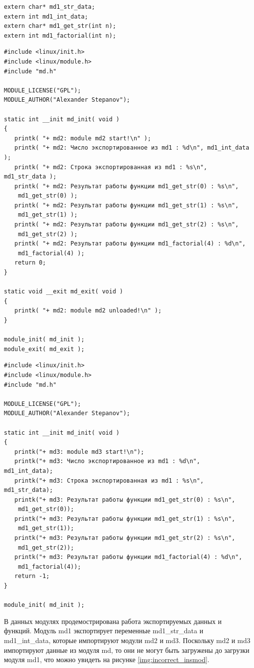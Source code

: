\begin{lstlisting}[caption=md.h]
extern char* md1_str_data;
extern int md1_int_data;
extern char* md1_get_str(int n);
extern int md1_factorial(int n);
\end{lstlisting}

\begin{lstlisting}[caption=md2.c]
#include <linux/init.h> 
#include <linux/module.h> 
#include "md.h" 

MODULE_LICENSE("GPL"); 
MODULE_AUTHOR("Alexander Stepanov"); 

static int __init md_init( void ) 
{ 
   printk( "+ md2: module md2 start!\n" ); 
   printk( "+ md2: Число экспортированное из md1 : %d\n", md1_int_data ); 
   printk( "+ md2: Строка экспортированная из md1 : %s\n", md1_str_data ); 
   printk( "+ md2: Результат работы функции md1_get_str(0) : %s\n",
    md1_get_str(0) );
   printk( "+ md2: Результат работы функции md1_get_str(1) : %s\n",
    md1_get_str(1) );
   printk( "+ md2: Результат работы функции md1_get_str(2) : %s\n",
    md1_get_str(2) );
   printk( "+ md2: Результат работы функции md1_factorial(4) : %d\n",
    md1_factorial(4) );  
   return 0; 
} 

static void __exit md_exit( void ) 
{ 
   printk( "+ md2: module md2 unloaded!\n" ); 
} 

module_init( md_init ); 
module_exit( md_exit );
\end{lstlisting}

\begin{lstlisting}[caption=md3.c]
#include <linux/init.h> 
#include <linux/module.h> 
#include "md.h" 

MODULE_LICENSE("GPL"); 
MODULE_AUTHOR("Alexander Stepanov"); 

static int __init md_init( void ) 
{ 
   printk("+ md3: module md3 start!\n"); 
   printk("+ md3: Число экспортированное из md1 : %d\n", md1_int_data); 
   printk("+ md3: Строка экспортированная из md1 : %s\n", md1_str_data); 
   printk("+ md3: Результат работы функции md1_get_str(0) : %s\n",
    md1_get_str(0));
   printk("+ md3: Результат работы функции md1_get_str(1) : %s\n",
    md1_get_str(1));
   printk("+ md3: Результат работы функции md1_get_str(2) : %s\n",
    md1_get_str(2));
   printk("+ md3: Результат работы функции md1_factorial(4) : %d\n",
    md1_factorial(4));
   return -1; 
} 

module_init( md_init ); 
\end{lstlisting}

В данных модулях продемострирована работа экспортируемых данных и функций. Модуль md1 экспортирует переменные md1\_str\_data и md1\_int\_data, которые импортируют модули md2 и md3. Поскольку md2 и md3 импортируют данные из модуля md, то они не могут быть загружены до загрузки модуля md1, что можно увидеть на рисунке \ref{img:incorrect_insmod}.

